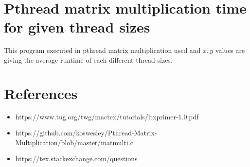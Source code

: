 \documentclass[12pt,oneside,a4paper]{article}
\title{\titlefont{Pthread RunTime Graph}}
\author{M.L.R.Yasara (CST140048)}
\begin{document}
	\maketitle

	\newpage

	\tableofcontents

	\newpage



		\section{Pthread matrix multiplication time for given thread sizes}

	\par
	This program executed in pthread matrix multiplication used and $x,y$ values are giving the average runtime of each different thread sizes.
	\hfill \break


	\newpage





	\section{References}

	\begin{itemize}
	  \item https://www.tug.org/twg/mactex/tutorials/ltxprimer-1.0.pdf
	  \item https://github.com/koswesley/Pthread-Matrix-Multiplication/blob/master/matmulti.c
	  \item https://tex.stackexchange.com/questions
	\end{itemize}
\end{document}

